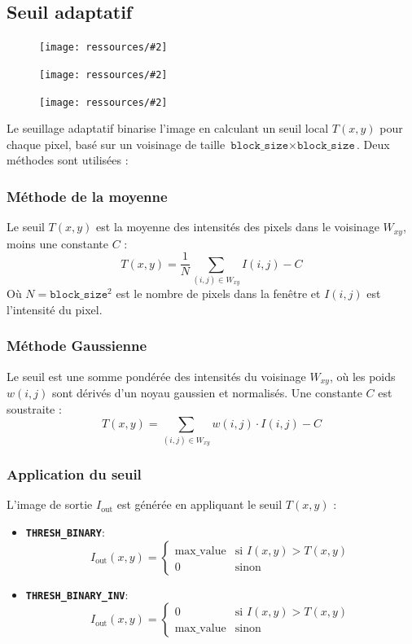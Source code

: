 \documentclass{article}
\newcommand{\stepimage}[3][0.3\textwidth]{%
  \minipage{#1}
    \texttt{[image: ressources/\#2]}
    \caption{#3}
  \endminipage\hfill
}
\begin{document}
\subsection{Seuil adaptatif}
\begin{figure}[!htb]
    \stepimage[0.26\textwidth]{image_1_step_03_threshold.png}{}
    \stepimage[0.26\textwidth]{image_2_step_03_threshold.png}{}
    \stepimage[0.26\textwidth]{image_3_step_03_threshold.png}{}
\end{figure}
Le seuillage adaptatif binarise l'image en calculant un seuil local \(T(x, y)\) pour chaque pixel, basé sur un voisinage de taille \(\texttt{block\_size} \times \texttt{block\_size}\). Deux méthodes sont utilisées :

\subsubsection{Méthode de la moyenne}
Le seuil \(T(x, y)\) est la moyenne des intensités des pixels dans le voisinage \(W_{xy}\), moins une constante \(C\) :
\[
T(x, y) = \frac{1}{N} \sum_{(i, j) \in W_{xy}} I(i, j) - C
\]
Où \(N = \texttt{block\_size}^2\) est le nombre de pixels dans la fenêtre et \(I(i, j)\) est l'intensité du pixel.

\subsubsection{Méthode Gaussienne}
Le seuil est une somme pondérée des intensités du voisinage \(W_{xy}\), où les poids \(w(i, j)\) sont dérivés d'un noyau gaussien et normalisés. Une constante \(C\) est soustraite :
\[
T(x, y) = \sum_{(i, j) \in W_{xy}} w(i, j) \cdot I(i, j) - C
\]

\subsubsection{Application du seuil}
L'image de sortie \(I_{\text{out}}\) est générée en appliquant le seuil \(T(x, y)\) :
\begin{itemize}
    \item \textbf{\texttt{THRESH\_BINARY}}:
    \[
    I_{\text{out}}(x, y) =
    \begin{cases}
    \text{max\_value} & \text{si } I(x, y) > T(x, y) \\
    0 & \text{sinon}
    \end{cases}
    \]
    \item \textbf{\texttt{THRESH\_BINARY\_INV}}:
    \[
    I_{\text{out}}(x, y) =
    \begin{cases}
    0 & \text{si } I(x, y) > T(x, y) \\
    \text{max\_value} & \text{sinon}
    \end{cases}
    \]
\end{itemize}
\end{document}
